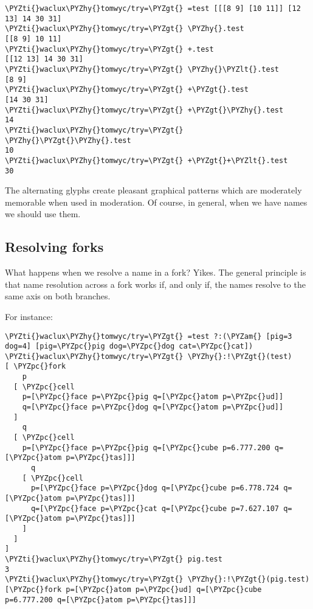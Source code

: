 \begin{framed_shaded}
\begin{Verbatim}[fontsize=\relsize{-2.5},fontseries=b,commandchars=\\\{\}]
\PYZti{}waclux\PYZhy{}tomwyc/try=\PYZgt{} =test [[[8 9] [10 11]] [12 13] 14 30 31]
\PYZti{}waclux\PYZhy{}tomwyc/try=\PYZgt{} \PYZhy{}.test
[[8 9] 10 11]
\PYZti{}waclux\PYZhy{}tomwyc/try=\PYZgt{} +.test
[[12 13] 14 30 31]
\PYZti{}waclux\PYZhy{}tomwyc/try=\PYZgt{} \PYZhy{}\PYZlt{}.test
[8 9]
\PYZti{}waclux\PYZhy{}tomwyc/try=\PYZgt{} +\PYZgt{}.test
[14 30 31]
\PYZti{}waclux\PYZhy{}tomwyc/try=\PYZgt{} +\PYZgt{}\PYZhy{}.test
14
\PYZti{}waclux\PYZhy{}tomwyc/try=\PYZgt{} \PYZhy{}\PYZgt{}\PYZhy{}.test
10
\PYZti{}waclux\PYZhy{}tomwyc/try=\PYZgt{} +\PYZgt{}+\PYZlt{}.test
30
\end{Verbatim}
\end{framed_shaded}

The alternating glyphs create pleasant graphical patterns which
are moderately memorable when used in moderation.  Of course, in
general, when we have names we should use them.

\subsection{Resolving forks}

What happens when we resolve a name in a fork?  Yikes.  The
general principle is that name resolution across a fork works if,
and only if, the names resolve to the same axis on both branches.

For instance:

\begin{framed_shaded}
\begin{Verbatim}[fontsize=\relsize{-2.5},fontseries=b,commandchars=\\\{\}]
\PYZti{}waclux\PYZhy{}tomwyc/try=\PYZgt{} =test ?:(\PYZam{} [pig=3 dog=4] [pig=\PYZpc{}pig dog=\PYZpc{}dog cat=\PYZpc{}cat])
\PYZti{}waclux\PYZhy{}tomwyc/try=\PYZgt{} \PYZhy{}:!\PYZgt{}(test)
[ \PYZpc{}fork
    p
  [ \PYZpc{}cell
    p=[\PYZpc{}face p=\PYZpc{}pig q=[\PYZpc{}atom p=\PYZpc{}ud]]
    q=[\PYZpc{}face p=\PYZpc{}dog q=[\PYZpc{}atom p=\PYZpc{}ud]]
  ]
    q
  [ \PYZpc{}cell
    p=[\PYZpc{}face p=\PYZpc{}pig q=[\PYZpc{}cube p=6.777.200 q=[\PYZpc{}atom p=\PYZpc{}tas]]]
      q
    [ \PYZpc{}cell
      p=[\PYZpc{}face p=\PYZpc{}dog q=[\PYZpc{}cube p=6.778.724 q=[\PYZpc{}atom p=\PYZpc{}tas]]]
      q=[\PYZpc{}face p=\PYZpc{}cat q=[\PYZpc{}cube p=7.627.107 q=[\PYZpc{}atom p=\PYZpc{}tas]]]
    ]
  ]
]
\PYZti{}waclux\PYZhy{}tomwyc/try=\PYZgt{} pig.test
3
\PYZti{}waclux\PYZhy{}tomwyc/try=\PYZgt{} \PYZhy{}:!\PYZgt{}(pig.test)
[\PYZpc{}fork p=[\PYZpc{}atom p=\PYZpc{}ud] q=[\PYZpc{}cube p=6.777.200 q=[\PYZpc{}atom p=\PYZpc{}tas]]]
\end{Verbatim}
\end{framed_shaded}

